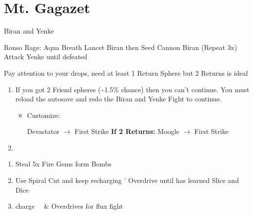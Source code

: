 \chapter{Mt. Gagazet}
\begin{battle}{Biran and Yenke}
	\begin{itemize}
		\kimahrif Ronso Rage: Aqua Breath
		\kimahrif Lancet Biran then Seed Cannon Biran (Repeat 3x)
		\kimahrif Attack Yenke until defeated
	\end{itemize}
	Pay attention to your drops, need at least 1 Return Sphere but 2 Returns is ideal
\end{battle}
\begin{enumerate}[resume]
	\item If you got 2 Friend spheres (\textasciitilde1.5\% chance) then you can't continue. You must reload the autosave and redo the Biran and Yenke Fight to continue.
		\begin{itemize}
			\item Customize:
			\begin{itemize}
				\rikkuf Devastator $\rightarrow$ First Strike
				\luluf \textbf{If 2 Returns:} Moogle $\rightarrow$ First Strike
			\end{itemize}
		\end{itemize}
	\item \formation{\tidus}{\rikku}{\lulu}
\end{enumerate}
\begin{enumerate}[resume]
	\item Steal 5x Fire Gems form Bombs
	\item Use Spiral Cut and keep recharging \tidus ' Overdrive until \tidus has learned Slice and Dice
	\item charge \rikku\, \lulu\ \& \tidus Overdrives for flux fight
\end{enumerate}
